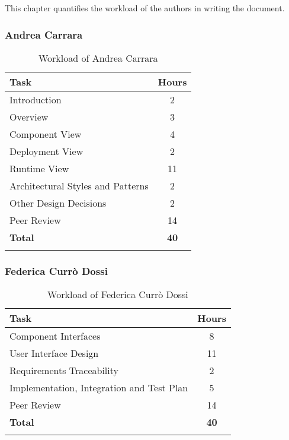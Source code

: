 This chapter quantifies the workload of the authors in writing the document.

\subsubsection{Andrea Carrara}
\renewcommand{\arraystretch}{1.5}
\begin{longtable}{|p{8.5cm}|c|}
    \hline \rowcolor{polimiblue!40}
    \textbf{Task} & \textbf{Hours} \\ \hline
    Introduction & 2  \\ \hline
    Overview & 3 \\ \hline
    Component View & 4\\ \hline
    Deployment View & 2 \\ \hline
    Runtime View & 11 \\ \hline
    Architectural Styles and Patterns & 2 \\ \hline
    Other Design Decisions & 2 \\ \hline
    Peer Review & 14 \\ \hline
    \hline \rowcolor{polimiblue!40}
    \textbf{Total} & \textbf{40} \\ \hline
\caption{Workload of Andrea Carrara}
\end{longtable}

\subsubsection{Federica Currò Dossi}
\renewcommand{\arraystretch}{1.5}
\begin{longtable}{|p{8.5cm}|c|}
    \hline \rowcolor{polimiblue!40}
    \textbf{Task} & \textbf{Hours} \\ \hline
    Component Interfaces & 8\\ \hline
    User Interface Design & 11\\ \hline
    Requirements Traceability & 2 \\ \hline
    Implementation, Integration and Test Plan & 5 \\ \hline
    Peer Review & 14 \\ \hline
    \hline \rowcolor{polimiblue!40}
    \textbf{Total} & \textbf{40} \\ \hline
\caption{Workload of Federica Currò Dossi}
\end{longtable}
